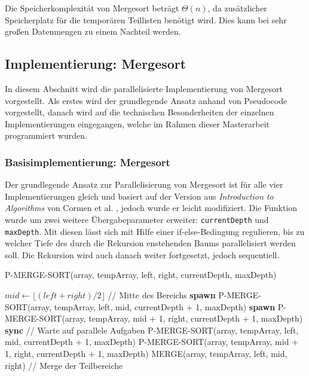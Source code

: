 \documentclass[fontsize=12pt,paper=a4,twoside=semi,parskip=half-,headsepline,headinclude]{scrreprt}
\begin{document}
Die Speicherkomplexität von Mergesort beträgt $\Theta(n)$, da zusätzlicher Speicherplatz für die temporären Teillisten benötigt wird. Dies kann bei sehr großen Datenmengen zu einem Nachteil werden.


\subsection{Implementierung: Mergesort}

In diesem Abschnitt wird die parallelisierte Implementierung von Mergesort vorgestellt. Als erstes wird der grundlegende Ansatz anhand von Pseudocode vorgestellt, danach wird auf die technischen Besonderheiten der einzelnen Implementierungen eingegangen, welche im Rahmen dieser Masterarbeit programmiert wurden.

\subsubsection{Basisimplementierung: Mergesort}
\label{subsubsec:implms}

Der grundlegende Ansatz zur Parallelisierung von Mergesort ist für alle vier Implementierungen gleich und basiert auf der Version aus \emph{Introduction to Algorithms} von Cormen et al. \cite[S. 775]{Cormen2022}, jedoch wurde er leicht modifiziert. Die Funktion wurde um zwei weitere Übergabeparameter erweiter: \texttt{currentDepth} und \texttt{maxDepth}. Mit diesen lässt sich mit Hilfe einer if-else-Bedingung regulieren, bis zu welcher Tiefe des durch die Rekursion enstehenden Baums parallelisiert werden soll. Die Rekursion wird auch danach weiter fortgesetzt, jedoch sequentiell.

\begin{algorithm}[H]
	\caption{P-MERGE-SORT(array, tempArray, left, right, currentDepth, maxDepth)}
	\begin{algorithmic}[1]
		\RETURN
		\ENDIF
		\STATE $mid \gets \lfloor (left + right) / 2 \rfloor$ \hfill // Mitte des Bereichs
		\STATE \textbf{spawn} P-MERGE-SORT(array, tempArray, left, mid, currentDepth + 1, maxDepth)
		\STATE \textbf{spawn} P-MERGE-SORT(array, tempArray, mid + 1, right, currentDepth + 1, maxDepth)
		\STATE \textbf{sync} \hfill // Warte auf parallele Aufgaben
		\ELSE
		\STATE P-MERGE-SORT(array, tempArray, left, mid, currentDepth + 1, maxDepth)
		\STATE P-MERGE-SORT(array, tempArray, mid + 1, right, currentDepth + 1, maxDepth)
		\ENDIF
		\STATE MERGE(array, tempArray, left, mid, right) \hfill // Merge der Teilbereiche
	\end{algorithmic}
\end{algorithm}
\end{document}
